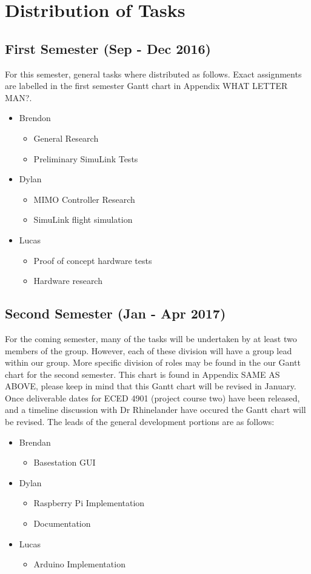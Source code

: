 \section{Distribution of Tasks}
\subsection{First Semester (Sep - Dec 2016)}
For this semester, general tasks where distributed as follows.  Exact assignments are labelled in the first semester Gantt chart in Appendix 	WHAT LETTER MAN?.

\begin{itemize}
	\item Brendon \begin{itemize}
		\item General Research
		\item Preliminary SimuLink Tests
	\end{itemize}
	\item Dylan \begin{itemize}
		\item MIMO Controller Research
		\item SimuLink flight simulation
	\end{itemize}
	\item Lucas \begin{itemize}
		\item Proof of concept hardware tests
		\item Hardware research
	\end{itemize}
\end{itemize}

\subsection{Second Semester (Jan - Apr 2017)}

For the coming semester, many of the tasks will be undertaken by at least two members of the group.  However, each of these division will have a group lead within our group.  More specific division of roles may be found in the our Gantt chart for the second semester.  This chart is found in Appendix SAME AS ABOVE, please keep in mind that this Gantt chart will be revised in January.  Once deliverable dates for ECED 4901 (project course two) have been released, and a timeline discussion with Dr Rhinelander have occured the Gantt chart will be revised.  The leads of the general development portions are as follows:

\begin{itemize}
	\item Brendan \begin{itemize}
		\item Basestation GUI
	\end{itemize}
	\item Dylan \begin{itemize}
		\item Raspberry Pi Implementation
		\item Documentation
	\end{itemize}
	\item Lucas \begin{itemize}
		\item Arduino Implementation
	\end{itemize}
\end{itemize}
